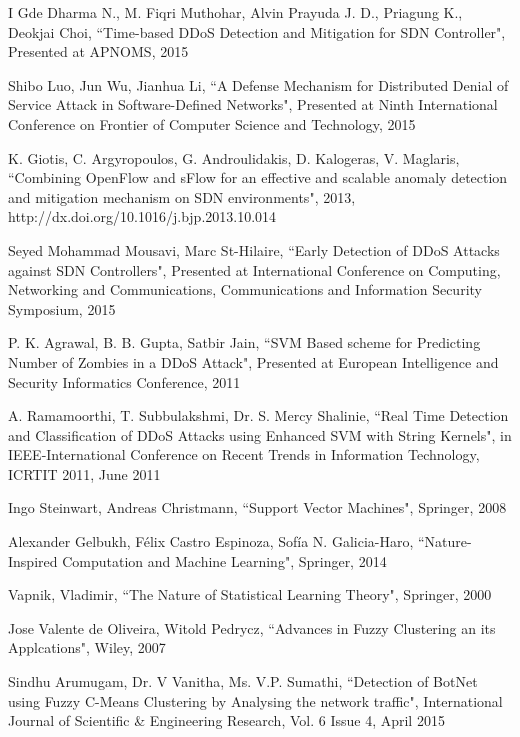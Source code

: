 \documentclass[12pt,a4paper,final]{report}
\begin{document}
\begin{thebibliography}{9}
I Gde Dharma N., M. Fiqri Muthohar, Alvin Prayuda J. D., Priagung K., Deokjai Choi,
``Time-based DDoS Detection and Mitigation for SDN Controller",
Presented at APNOMS,
2015

Shibo Luo, Jun Wu, Jianhua Li,
``A Defense Mechanism for Distributed Denial of Service Attack in Software-Defined Networks",
Presented at Ninth International Conference on Frontier of Computer Science and Technology,
2015

K. Giotis, C. Argyropoulos, G. Androulidakis, D. Kalogeras, V. Maglaris,
``Combining OpenFlow and sFlow for an effective and scalable anomaly detection and mitigation mechanism on SDN environments",
2013, 
http://dx.doi.org/10.1016/j.bjp.2013.10.014

Seyed Mohammad Mousavi, Marc St-Hilaire,
``Early Detection of DDoS Attacks against SDN Controllers",
Presented at International Conference on Computing, Networking and Communications, Communications and Information Security
Symposium,
2015

P. K. Agrawal, B. B. Gupta, Satbir Jain,
``SVM Based scheme for Predicting Number of Zombies in a DDoS Attack",
Presented at European Intelligence and Security Informatics Conference,
2011

A. Ramamoorthi, T. Subbulakshmi, Dr. S. Mercy Shalinie,
``Real Time Detection and Classification of DDoS Attacks using Enhanced SVM with String Kernels",
in IEEE-International Conference on Recent Trends in Information Technology,
ICRTIT 2011,
June 2011

Ingo Steinwart, Andreas Christmann,
``Support Vector Machines",
Springer, 
2008

Alexander Gelbukh, Félix Castro Espinoza, Sofía N. Galicia-Haro,
``Nature-Inspired Computation and Machine Learning",
Springer,
2014

Vapnik, Vladimir,
``The Nature of Statistical Learning Theory",
Springer,
2000

Jose Valente de Oliveira, Witold Pedrycz,
``Advances in Fuzzy Clustering an its Applcations",
Wiley,
2007

Sindhu Arumugam, Dr. V Vanitha, Ms. V.P. Sumathi,
``Detection of BotNet using Fuzzy C-Means Clustering by Analysing the network traffic",
International Journal of Scientific \& Engineering Research, Vol. 6 Issue 4,
April 2015


\end{thebibliography}
\end{document}
